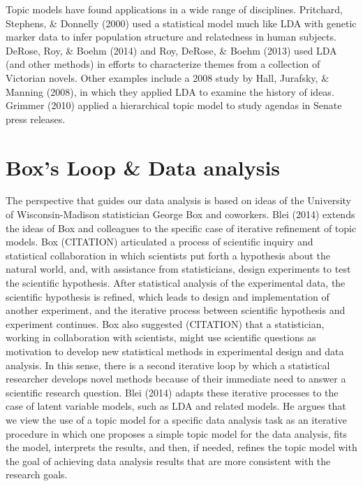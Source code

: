 \documentclass[12pt,]{article}
\begin{document}
Topic models have found applications in a wide range of disciplines.
Pritchard, Stephens, \& Donnelly (2000) used a statistical model much
like LDA with genetic marker data to infer population structure and
relatedness in human subjects. DeRose, Roy, \& Boehm (2014) and Roy,
DeRose, \& Boehm (2013) used LDA (and other methods) in efforts to
characterize themes from a collection of Victorian novels. Other
examples include a 2008 study by Hall, Jurafsky, \& Manning (2008), in
which they applied LDA to examine the history of ideas. Grimmer (2010)
applied a hierarchical topic model to study agendas in Senate press
releases.

\section{Box's Loop \& Data analysis}\label{boxs-loop-data-analysis}



The perspective that guides our data analysis is based on ideas of the
University of Wisconsin-Madison statistician George Box and coworkers.
Blei (2014) extends the ideas of Box and colleagues to the specific case
of iterative refinement of topic models. Box (CITATION) articulated a
process of scientific inquiry and statistical collaboration in which
scientists put forth a hypothesis about the natural world, and, with
assistance from statisticians, design experiments to test the scientific
hypothesis. After statistical analysis of the experimental data, the
scientific hypothesis is refined, which leads to design and
implementation of another experiment, and the iterative process between
scientific hypothesis and experiment continues. Box also suggested
(CITATION) that a statistician, working in collaboration with
scientists, might use scientific questions as motivation to develop new
statistical methods in experimental design and data analysis. In this
sense, there is a second iterative loop by which a statistical
researcher develops novel methods because of their immediate need to
answer a scientific research question. Blei (2014) adapts these
iterative processes to the case of latent variable models, such as LDA
and related models. He argues that we view the use of a topic model for
a specific data analysis task as an iterative procedure in which one
proposes a simple topic model for the data analysis, fits the model,
interprets the results, and then, if needed, refines the topic model
with the goal of achieving data analysis results that are more
consistent with the research goals.
\end{document}
